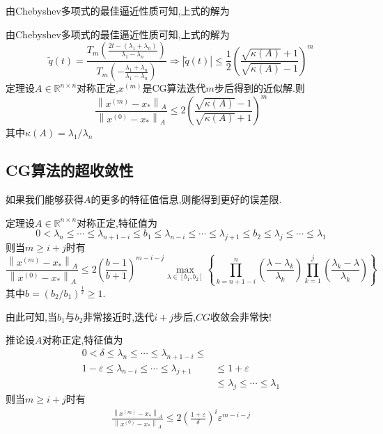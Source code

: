 \documentclass[12pt,a4paper]{article}
\begin{document}
由Chebyshev多项式的最佳逼近性质可知,上式的解为

由Chebyshev多项式的最佳逼近性质可知,上式的解为
$$
\tilde{q}(t)=\frac{T_{m}\left(\frac{2 t-\left(\lambda_{1}+\lambda_{n}\right)}{\lambda_{1}-\lambda_{n}}\right)}{T_{m}\left(-\frac{\lambda_{1}+\lambda_{n}}{\lambda_{1}-\lambda_{n}}\right)} \Longrightarrow|\tilde{q}(t)| \leq \frac{1}{2}\left(\frac{\sqrt{\kappa(A)}+1}{\sqrt{\kappa(A)}-1}\right)^{m}
$$
{\color{blue}定理}\qquad 设$A \in \mathbb{R}^{n \times n}$对称正定,$x^{(m)}$是CG算法迭代$m$步后得到的近似解.则
$$
\frac{\left\|x^{(m)}-x_{*}\right\|_{A}}{\left\|x^{(0)}-x_{*}\right\|_{A}} \leq 2\left(\frac{\sqrt{\kappa(A)}-1}{\sqrt{\kappa(A)}+1}\right)^{m}
$$
其中$\kappa(A)=\lambda_{1} / \lambda_{n}$\\
\subsection*{CG算法的超收敛性}
如果我们能够获得$A$的更多的特征值信息,则能得到更好的误差限.

{\color{blue}定理}\qquad 设$A \in \mathbb{R}^{n \times n}$对称正定,特征值为
$$
0<\lambda_{n} \leq \cdots \leq \lambda_{n+1-i} \leq b_{1} \leq \lambda_{n-i} \leq \cdots \leq \lambda_{j+1} \leq b_{2} \leq \lambda_{j} \leq \cdots \leq \lambda_{1}
$$
则当$m \geq i+j$时有
$$
\frac{\left\|x^{(m)}-x_{*}\right\|_{A}}{\left\|x^{(0)}-x_{*}\right\|_{A}} \leq 2\left(\frac{b-1}{b+1}\right)^{m-i-j} \max _{\lambda \in\left[b_{1}, b_{2}\right]}\left\{\prod_{k=n+1-i}^{n}\left(\frac{\lambda-\lambda_{k}}{\lambda_{k}}\right) \prod_{k=1}^{j}\left(\frac{\lambda_{k}-\lambda}{\lambda_{k}}\right)\right\}
$$
其中$b=\left(b_{2} / b_{1}\right)^{\frac{1}{2}} \geq 1$.

由此可知,当$b_1$与$b_2$非常接近时,迭代$i+j$步后,$CG$收敛会非常快!

{\color{blue}推论}\quad 设$A$对称正定,特征值为
$$
\begin{aligned} 0<\delta \leq \lambda_{n} \leq \cdots \leq \lambda_{n+1-i} \leq \\ 1-\varepsilon \leq \lambda_{n-i} \leq \cdots \leq \lambda_{j+1} & \leq 1+\varepsilon \\ & \leq \lambda_{j} \leq \cdots \leq \lambda_{1} \end{aligned}
$$
则当$m \geq i+j$时有
\begin{align*}
	\frac{\left\|x^{(m)}-x_{*}\right\|_{A}}{\left\|x^{(0)}-x_{*}\right\|_{A}} \leq 2\left(\frac{1+\varepsilon}{\delta}\right)^{i} \varepsilon^{m-i-j}
	\tag{7.16}
\end{align*}
\end{document}
